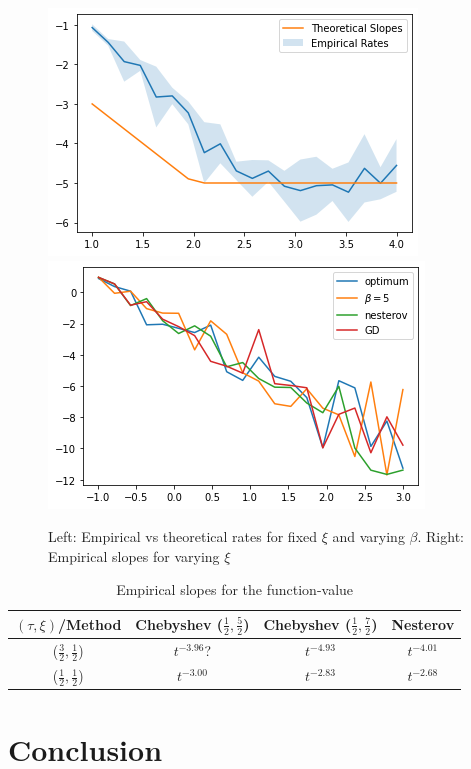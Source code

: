 \documentclass{article}
\begin{document}
\begin{figure}[H]
    \centering
    \includegraphics[width=5 cm]{imgs/theo vs practic.png}\includegraphics[width= 5 cm]{imgs/slopes.png}
    
    
    \caption{Left: Empirical vs theoretical rates for fixed $\xi$ and varying $\beta$. Right: Empirical slopes for varying $\xi$}
    \label{fig:my_label}
\end{figure}

\begin{table}[H]
    \centering
    \begin{tabular}{c|c|c|c}
         $(\tau,\xi)$/Method& Chebyshev ($\frac{1}{2},\frac{5}{2}$) & Chebyshev ($\frac{1}{2},\frac{7}{2}$) &  Nesterov  \\
         \hline
         ($\frac{3}{2},\frac{1}{2}$)&$t^{-3.96}$? & $t^{-4.93}$ & $t^{-4.01}$\\
         \hline
         ($\frac{1}{2},\frac{1}{2}$)&$t^{-3.00}$ & $t^{-2.83}$ & $t^{-2.68}$
         
    \end{tabular}
    \caption{Empirical slopes for the function-value }
    \label{tab:experimental rates}
\end{table}


\section{Conclusion}
\printbibliography
\appendix
\newpage
\end{document}
